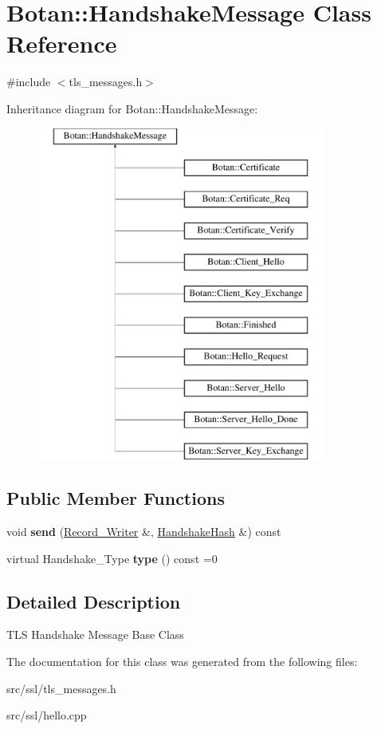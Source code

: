 \hypertarget{classBotan_1_1HandshakeMessage}{\section{Botan\-:\-:Handshake\-Message Class Reference}
\label{classBotan_1_1HandshakeMessage}
}


{\ttfamily \#include $<$tls\-\_\-messages.\-h$>$}

Inheritance diagram for Botan\-:\-:Handshake\-Message\-:\begin{figure}[H]
\begin{center}
\leavevmode
\includegraphics[height=11.000000cm]{classBotan_1_1HandshakeMessage}
\end{center}
\end{figure}
\subsection*{Public Member Functions}
\begin{DoxyCompactItemize}
\item 
\hypertarget{classBotan_1_1HandshakeMessage_adfa42c19f454bf72f3139c6a861b05fc}{void {\bfseries send} (\hyperlink{classBotan_1_1Record__Writer}{Record\-\_\-\-Writer} \&, \hyperlink{classBotan_1_1HandshakeHash}{Handshake\-Hash} \&) const }\label{classBotan_1_1HandshakeMessage_adfa42c19f454bf72f3139c6a861b05fc}

\item 
\hypertarget{classBotan_1_1HandshakeMessage_a9ec4d99a0dc031c732ee4b4ce33e056e}{virtual Handshake\-\_\-\-Type {\bfseries type} () const =0}\label{classBotan_1_1HandshakeMessage_a9ec4d99a0dc031c732ee4b4ce33e056e}

\end{DoxyCompactItemize}


\subsection{Detailed Description}
T\-L\-S Handshake Message Base Class 

The documentation for this class was generated from the following files\-:\begin{DoxyCompactItemize}
\item 
src/ssl/tls\-\_\-messages.\-h\item 
src/ssl/hello.\-cpp\end{DoxyCompactItemize}
